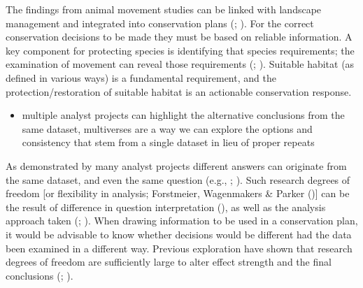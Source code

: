 \documentclass[10pt,a4paper]{article}
\providecommand{\tightlist}{%
  \setlength{\itemsep}{0pt}\setlength{\parskip}{0pt}}
\begin{document}
The findings from animal movement studies can be linked with landscape management and integrated into conservation plans (; ).
For the correct conservation decisions to be made they must be based on reliable information.
A key component for protecting species is identifying that species requirements; the examination of movement can reveal those requirements (; ).
Suitable habitat (as defined in various ways) is a fundamental requirement, and the protection/restoration of suitable habitat is an actionable conservation response.

\begin{itemize}
\tightlist
\item
  multiple analyst projects can highlight the alternative conclusions from the same dataset, multiverses are a way we can explore the options and consistency that stem from a single dataset in lieu of proper repeats
\end{itemize}

As demonstrated by many analyst projects different answers can originate from the same dataset, and even the same question (e.g., ; ).
Such research degrees of freedom {[}or flexibility in analysis; Forstmeier, Wagenmakers \& Parker (){]} can be the result of difference in question interpretation (), as well as the analysis approach taken (; ).
When drawing information to be used in a conservation plan, it would be advisable to know whether decisions would be different had the data been examined in a different way.
Previous exploration have shown that research degrees of freedom are sufficiently large to alter effect strength and the final conclusions (; ).
\end{document}
